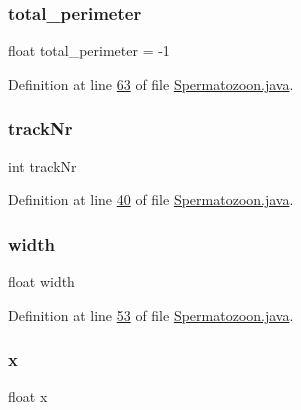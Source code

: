 \subsubsection{\texorpdfstring{total\+\_\+perimeter}{total\_perimeter}}
{\footnotesize\ttfamily float total\+\_\+perimeter = -\/1}



Definition at line \hyperlink{_spermatozoon_8java_source_l00063}{63} of file \hyperlink{_spermatozoon_8java_source}{Spermatozoon.\+java}.

\hypertarget{classdata_1_1_spermatozoon_aee0b3af79335b49fe9d9b025cfcde703}{}\label{classdata_1_1_spermatozoon_aee0b3af79335b49fe9d9b025cfcde703} 
\subsubsection{\texorpdfstring{track\+Nr}{trackNr}}
{\footnotesize\ttfamily int track\+Nr}



Definition at line \hyperlink{_spermatozoon_8java_source_l00040}{40} of file \hyperlink{_spermatozoon_8java_source}{Spermatozoon.\+java}.

\hypertarget{classdata_1_1_spermatozoon_ae426f00e82704fa09578f5446e22d915}{}\label{classdata_1_1_spermatozoon_ae426f00e82704fa09578f5446e22d915} 
\subsubsection{\texorpdfstring{width}{width}}
{\footnotesize\ttfamily float width}



Definition at line \hyperlink{_spermatozoon_8java_source_l00053}{53} of file \hyperlink{_spermatozoon_8java_source}{Spermatozoon.\+java}.

\hypertarget{classdata_1_1_spermatozoon_ad0da36b2558901e21e7a30f6c227a45e}{}\label{classdata_1_1_spermatozoon_ad0da36b2558901e21e7a30f6c227a45e} 
\subsubsection{\texorpdfstring{x}{x}}
{\footnotesize\ttfamily float x}




